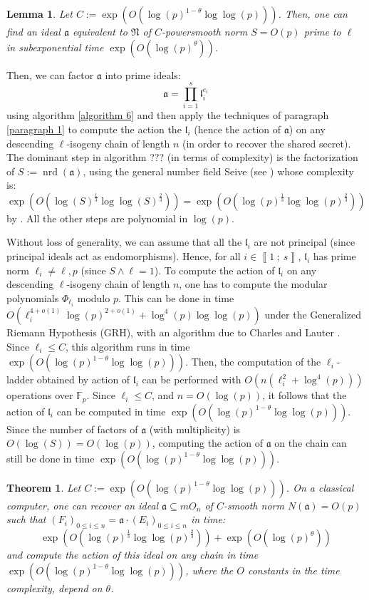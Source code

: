 \documentclass[a4paper,10pt]{report}
\theoremstyle{definition}
\theoremstyle{plain}
\newtheorem{lemma}[definition]{Lemma}
\newtheorem{theorem}[definition]{Theorem}
\theoremstyle{definition}
\newcommand{\F}{\mathbb{F}}
\renewcommand{\i}[2]{\left\llbracket #1~;~#2\right\rrbracket}
\renewcommand{\(}{\left(}
\renewcommand{\)}{\right)}
\newcommand{\mf}[1]{\mathfrak{#1}}
\DeclareMathOperator{\nrd}{nrd}
\begin{document}
\begin{lemma}
Let $C:=\exp\(O\(\log(p)^{1-\theta}\log\log(p)\)\)$. Then, one can find an ideal $\mf{a}$ equivalent to $\mf{N}$ of $C$-powersmooth norm $S=O(p)$ prime to $\ell$ in subexponential time $\exp(O(\log(p)^\theta))$. 
\end{lemma}

Then, we can factor $\mf{a}$ into prime ideals: 
\[\mf{a}=\prod_{i=1}^s \mf{l}_i^{e_i}\]
using algorithm \ref{algorithm 6} and then apply the techniques of paragraph \ref{paragraph 1} to compute the action the $\mf{l}_i$ (hence the action of $\mf{a}$) on any descending $\ell$-isogeny chain of length $n$ (in order to recover the shared secret). The dominant step in algorithm ??? (in terms of complexity) is the factorization of $S:=\nrd(\mf{a})$,  using the general number field Seive (see \cite[§ 10.5]{Cohen1}) whose complexity is:
\[\exp\(O\(\log(S)^{\frac{1}{3}}\log\log(S)^{\frac{2}{3}}\)\)=\exp\(O\(\log(p)^{\frac{1}{3}}\log\log(p)^{\frac{2}{3}}\)\)\]
by \cite{MicrosoftGNFS}. All the other steps are polynomial in $\log(p)$.  

Without loss of generality, we can assume that all the $\mf{l}_i$ are not principal (since principal ideals act as endomorphisms). Hence, for all $i\in\i{1}{s}$,  $\mf{l}_i$ has prime norm $\ell_i\neq\ell, p$ (since $S\wedge \ell=1$). To compute the action of $\mf{l}_i$ on any descending $\ell$-isogeny chain of length $n$, one has to compute the modular polynomials $\Phi_{\ell_i}$ modulo $p$.  This can be done in time $O(\ell_i^{4+o(1)}\log(p)^{2+o(1)}+\log^4(p)\log\log(p))$ under the Generalized Riemann Hypothesis (GRH), with an algorithm due to Charles and Lauter \cite{LauterModPol}. Since $\ell_i\leq C$, this algorithm runs in time $\exp\(O\(\log(p)^{1-\theta}\log\log(p)\)\)$. Then, the computation of the $\ell_i$-ladder obtained by action of $\mf{l}_i$ can be performed with $O(n(\ell_i^2+\log^4(p)))$ operations over $\F_p$. Since $\ell_i\leq C$, and $n=O(\log(p))$, it follows that the action of $\mf{l}_i$ can be computed in time $\exp\(O\(\log(p)^{1-\theta}\log\log(p)\)\)$. Since the number of factors of $\mf{a}$ (with multiplicity) is $O(\log(S))=O(\log(p))$, computing the action of $\mf{a}$ on the chain can still be done in time $\exp\(O\(\log(p)^{1-\theta}\log\log(p)\)\)$.

\begin{theorem}
Let $C:=\exp\(O\(\log(p)^{1-\theta}\log\log(p)\)\)$. On a classical computer, one can recover an ideal $\mf{a}\subseteq mO_n$ of $C$-smooth norm $N(\mf{a})=O(p)$ such that $(F_i)_{0\leq i\leq n}=\mf{a}\cdot (E_i)_{0\leq i\leq n}$ in time:
\[\exp\(O\(\log(p)^{\frac{1}{3}}\log\log(p)^{\frac{2}{3}}\)\)+\exp\(O\(\log(p)^{\theta}\)\)\]
and compute the action of this ideal on any chain in time $\exp\(O\(\log(p)^{1-\theta}\log\log(p)\)\)$, where the $O$ constants in the time complexity, depend on $\theta$.
\end{theorem}
\end{document}
